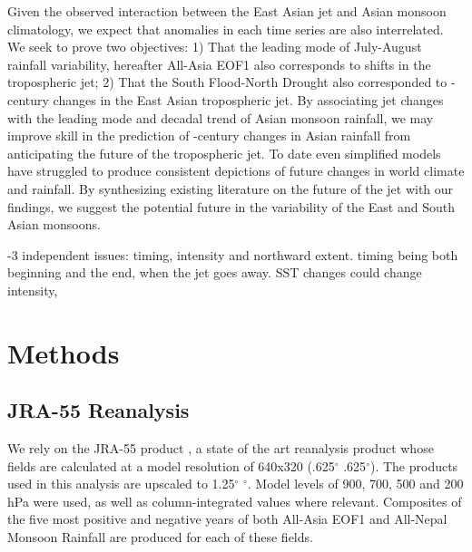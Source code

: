 	 
	Given the observed interaction between the East Asian jet and Asian monsoon climatology, we expect that anomalies in each time series are also interrelated. We seek to prove two objectives: 1) That the leading mode of July-August rainfall variability, hereafter All-Asia EOF1 \citep{Day2015} also corresponds to shifts in the tropospheric jet; 2) That the South Flood-North Drought also corresponded to -century changes in the East Asian tropospheric jet. By associating jet changes with the leading mode and decadal trend of Asian monsoon rainfall, we may improve skill in the prediction of -century changes in Asian rainfall from anticipating the future of the tropospheric jet. To date even simplified models have struggled to produce consistent depictions of future changes in world climate and rainfall. By synthesizing existing literature on the future of the jet with our findings, we suggest the potential future in the variability of the East and South Asian monsoons.
	  
	-3 independent issues: timing, intensity and northward extent. timing being both beginning and the end, when the jet goes away. SST changes could change intensity, 
	
\section{Methods}

\subsection{JRA-55 Reanalysis}

	We rely on the JRA-55 product  , a state of the art reanalysis product whose fields are calculated at a model resolution of 640x320 (.625$^{\circ}$ \times .625$^{\circ}$). The products used in this analysis are upscaled to 1.25$^{\circ}$ $^{\circ}$. Model levels of 900, 700, 500 and 200 hPa were used, as well as column-integrated values where relevant. Composites of the five most positive and negative years of both All-Asia EOF1 and All-Nepal Monsoon Rainfall are produced for each of these fields. 
	
